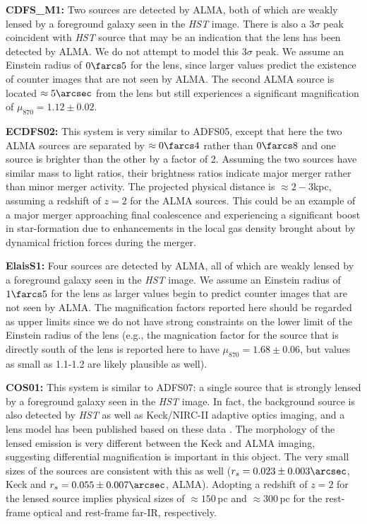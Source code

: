 \documentclass[iop]{emulateapj}
\begin{document}
{\bf CDFS\_M1:} Two sources are detected by ALMA, both of which are weakly
lensed by a foreground galaxy seen in the {\it HST} image.  There is also a
3$\sigma$ peak coincident with {\it HST} source that may be an indication that
the lens has been detected by ALMA.  We do not attempt to model this 3$\sigma$
peak.  We assume an Einstein radius of $0\farcs5$ for the lens, since larger
values predict the existence of counter images that are not seen by ALMA.  The
second ALMA source is located $\approx5\arcsec$ from the lens but still
experiences a significant magnification of $\mu_{870} = 1.12 \pm 0.02$.

{\bf ECDFS02:} This system is very similar to ADFS05, except that here the two
ALMA sources are separated by $\approx 0\farcs4$ rather than $0\farcs8$ and one
source is brighter than the other by a factor of 2.  Assuming the two sources
have similar mass to light ratios, their brightness ratios indicate major
merger rather than minor merger activity.  The projected physical distance is
$\approx 2-3$kpc, assuming a redshift of $z=2$ for the ALMA sources.  This
could be an example of a major merger approaching final coalescence and
experiencing a significant boost in star-formation due to enhancements in the
local gas density brought about by dynamical friction forces during the merger.

{\bf ElaisS1:} Four sources are detected by ALMA, all of which are weakly
lensed by a foreground galaxy seen in the {\it HST} image.  We assume an
Einstein radius of $1\farcs5$ for the lens as larger values begin to predict
counter images that are not seen by ALMA.  The magnification factors reported
here should be regarded as upper limits since we do not have strong constraints
on the lower limit of the Einstein radius of the lens (e.g., the magnication
factor for the source that is directly south of the lens is reported here to
have $\mu_{870} = 1.68 \pm 0.06$, but values as small as 1.1-1.2 are likely
plausible as well).

{\bf COS01:} This system is similar to ADFS07: a single source that is strongly
lensed by a foreground galaxy seen in the {\it HST} image.  In fact, the
background source is also detected by {\it HST} as well as Keck/NIRC-II
adaptive optics imaging, and a lens model has been published based on these
data \citep{Calanog:2014lr}.  The morphology of the lensed emission is very
different between the Keck and ALMA imaging, suggesting differential
magnification is important in this object.  The very small sizes of the sources
are consistent with this as well ($r_s = 0.023 \pm 0.003\arcsec$, Keck and $r_s
= 0.055 \pm 0.007\arcsec$, ALMA).  Adopting a redshift of $z=2$ for the lensed
source implies physical sizes of $\approx 150\,$pc and $\approx 300\,$pc for
the rest-frame optical and rest-frame far-IR, respectively.
\end{document}

